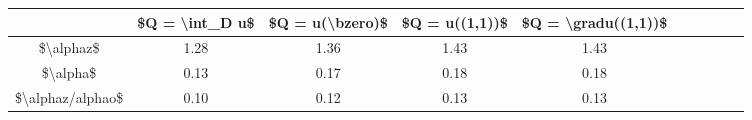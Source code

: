 \begin{tabular}{Sc Sc Sc Sc Sc}
\toprule
{} & \$Q = \textbackslash int\_D u\$ & \$Q = u(\textbackslash bzero)\$ & \$Q = u((1,1))\$ & \$Q = \textbackslash gradu((1,1))\$ \\
\midrule
\$\textbackslash alphaz\$        &           1.28 &            1.36 &           1.43 &                1.43 \\
\$\textbackslash alpha\$         &           0.13 &            0.17 &           0.18 &                0.18 \\
\$\textbackslash alphaz/alphao\$ &           0.10 &            0.12 &           0.13 &                0.13 \\
\bottomrule
\end{tabular}

